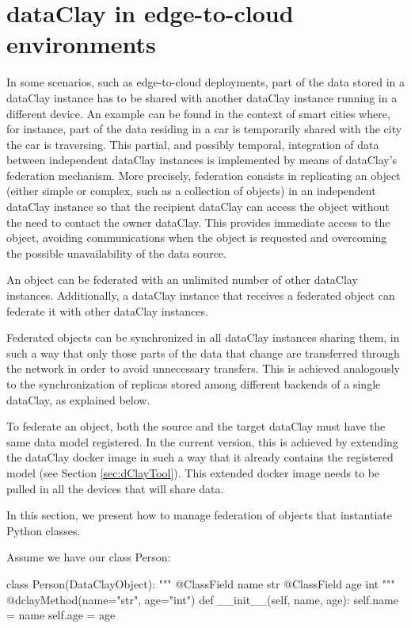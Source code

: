 \section{dataClay in edge-to-cloud environments}
\label{sec:pFederation}

In some scenarios, such as edge-to-cloud deployments, part of the data stored in a dataClay instance has to be shared with another dataClay instance running in a different device. An example can be found in the context of smart cities where, for instance, part of the data residing in a car is temporarily shared with the city the car is traversing. This partial, and possibly temporal, integration of data between independent dataClay instances is implemented by means of dataClay's federation mechanism.
More precisely, federation consists in replicating an object (either simple or complex, such as a collection of objects) in an independent dataClay instance so that the recipient dataClay can access the object without the need to contact the owner dataClay. This provides immediate access to the object, avoiding communications when the object is requested and overcoming the possible unavailability of the data source. 

An object can be federated with an unlimited number of other dataClay instances. Additionally, a dataClay instance that receives a federated object can federate it with other dataClay instances.

Federated objects can be synchronized in all dataClay instances sharing them, in such a way that only those parts of the data that change are transferred through the network in order to avoid unnecessary transfers. This is achieved analogously to the synchronization of replicas stored among different backends of a single dataClay, as explained below. 

To federate an object, both the source and the target dataClay must have the same data model registered. In the current version, this is achieved by extending the dataClay docker image in such a way that it already contains the registered model (see Section \ref{sec:dClayTool}). This extended docker image needs to be pulled in all the devices that will share data.

In this section, we present how to manage federation of objects that instantiate Python classes. 

Assume we have our class Person:

\begin{tBox}
\begin{python}
class Person(DataClayObject):
     """
     @ClassField name str
     @ClassField age int
     """
    @dclayMethod(name="str", age="int")
    def __init__(self, name, age):
        self.name = name
        self.age = age
\end{python}
\end{tBox}

